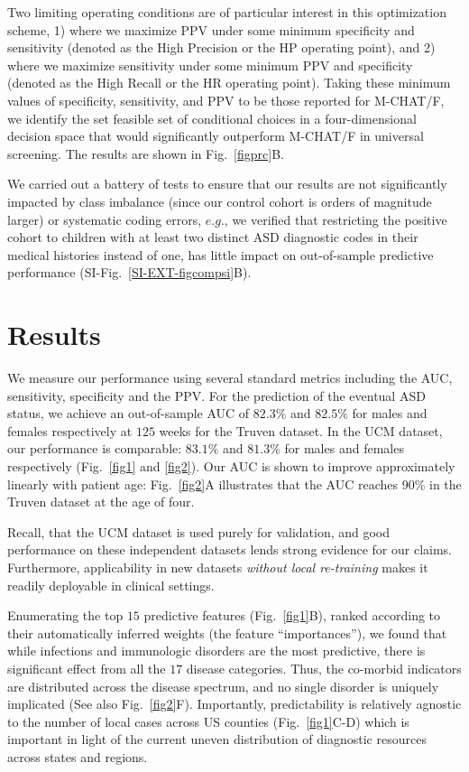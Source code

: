 \documentclass[onecolumn,,10pt]{IEEEtran}
\def\treatment{positive\xspace}
\begin{document}
Two limiting operating conditions are  of particular interest in this optimization scheme, 1) where we maximize PPV under some minimum specificity and sensitivity (denoted as  the High Precision or the HP operating point), and 2) where we maximize sensitivity under some minimum PPV and specificity (denoted as the High Recall or the HR  operating point). Taking these minimum values of specificity, sensitivity, and PPV to be those reported for  M-CHAT/F, we identify the set feasible set of conditional choices in a four-dimensional decision space  that would  significantly outperform M-CHAT/F in universal screening. The results are shown in Fig.~\ref{figprc}B.

We carried out a battery of tests to ensure that our results are not significantly impacted by class imbalance (since our control cohort is orders of magnitude larger) or systematic coding errors, $e.g.$, we verified that restricting the \treatment cohort to children with at least two  distinct ASD diagnostic codes in their medical histories instead of one, has little impact on  out-of-sample predictive performance (SI-Fig.~\ref{SI-EXT-figcompsi}B). 

\section*{Results}
We measure our performance using several standard metrics including the AUC, sensitivity, specificity and the PPV. For the prediction of the eventual ASD  status, we achieve an out-of-sample AUC of $82.3\%$ and  $82.5\%$ for males and females respectively at $125$ weeks for the Truven dataset. In the UCM dataset, our performance is comparable: $83.1\%$ and $81.3\%$ for males and females respectively (Fig.~\ref{fig1} and \ref{fig2}).  Our AUC is shown to improve approximately  linearly  with patient age: Fig.~\ref{fig2}A illustrates that the  AUC  reaches 90\%  in the Truven dataset at the age of four.

Recall, that the UCM dataset is used purely for validation, and good  performance on these independent datasets lends strong evidence for our claims. Furthermore, applicability in new datasets \textit{without local re-training} makes it readily  deployable in clinical settings.

Enumerating the top $15$ predictive features (Fig.~\ref{fig1}B), ranked  according to their automatically inferred weights  (the feature ``importances''), we found that while infections and immunologic disorders are the most predictive, there is significant effect from all the $17$ disease categories. Thus, the  co-morbid indicators are  distributed across the disease spectrum, and no single  disorder is uniquely implicated (See also Fig.~\ref{fig2}F). Importantly, predictability is relatively agnostic to the number of local cases across US counties (Fig.~\ref{fig1}C-D) which is important in light of the current uneven distribution of  diagnostic resources~\cite{gordon2016whittling,althouse2006pediatric} across states and regions.
 
\end{document}
